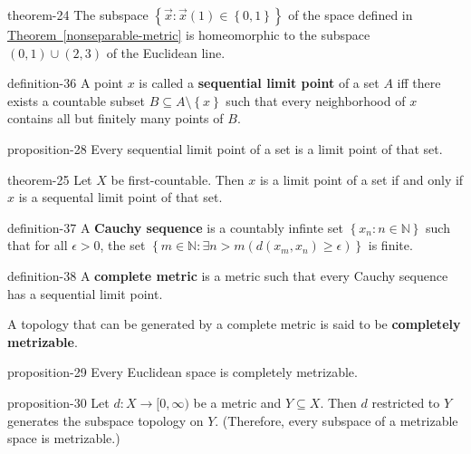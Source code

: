 \documentclass[10pt,]{article}
\newcommand{\terminology}[1]{\textbf{#1}}
\newcommand{\mb}{\mathbb}
\newcommand{\setBuilder}[2]{\left\{#1:#2\right\}}
\newcommand{\setList}[1]{\left\{#1\right\}}
\newcommand{\gt}{>}
\begin{document}
\begin{theorem}{}{}{theorem-24}%
\hypertarget{p-125}{}%
The subspace \(\setBuilder{\vec x}{\vec{x}(1)\in\setList{0,1}}\) of the space defined in \hyperref[nonseparable-metric]{Theorem~\ref{nonseparable-metric}} is homeomorphic to the subspace \((0,1)\cup(2,3)\) of the Euclidean line.%
\end{theorem}
\begin{definition}{}{definition-36}%
\hypertarget{p-126}{}%
A point \(x\) is called a \terminology{sequential limit point} of a set \(A\) iff there exists a countable subset \(B\subseteq A\setminus\setList{x}\) such that every neighborhood of \(x\) contains all but finitely many points of \(B\).%
\end{definition}
\begin{proposition}{}{}{proposition-28}%
\hypertarget{p-127}{}%
Every sequential limit point of a set is a limit point of that set.%
\end{proposition}
\begin{theorem}{}{}{theorem-25}%
\hypertarget{p-128}{}%
Let \(X\) be first-countable. Then \(x\) is a limit point of a set if and only if \(x\) is a sequental limit point of that set.%
\end{theorem}
\begin{definition}{}{definition-37}%
\hypertarget{p-129}{}%
A \terminology{Cauchy sequence} is a countably infinte set \(\setBuilder{x_n}{n\in\mb N}\) such that for all \(\epsilon\gt0\), the set \(\setBuilder{m\in\mb N}{\exists n>m(d(x_m,x_n)\geq\epsilon)}\) is finite.%
\end{definition}
\begin{definition}{}{definition-38}%
\hypertarget{p-130}{}%
A \terminology{complete metric} is a metric such that every Cauchy sequence has a sequential limit point.%
\par
\hypertarget{p-131}{}%
A topology that can be generated by a complete metric is said to be \terminology{completely metrizable}.%
\end{definition}
\begin{proposition}{}{}{proposition-29}%
\hypertarget{p-132}{}%
Every Euclidean space is completely metrizable.%
\end{proposition}
\begin{proposition}{}{}{proposition-30}%
\hypertarget{p-133}{}%
Let \(d:X\to[0,\infty)\) be a metric and \(Y\subseteq X\). Then \(d\) restricted to \(Y\) generates the subspace topology on \(Y\). (Therefore, every subspace of a metrizable space is metrizable.)%
\end{proposition}
\end{document}
